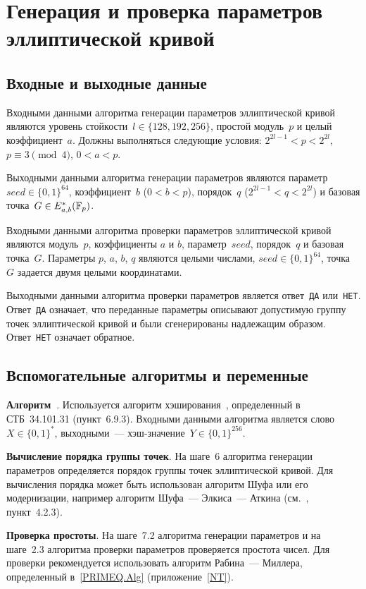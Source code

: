 \section{Генерация и проверка параметров эллиптической кривой}\label{PARAMS}

\subsection{Входные и выходные данные}

Входными данными алгоритма генерации параметров эллиптической кривой 
являются уровень стойкости~$l\in\{128,192,256\}$, 
простой модуль~$p$ и целый коэффициент~$a$.
%
Должны выполняться следующие условия: $2^{2l-1}<p<2^{2l}$,
$p\equiv 3\pmod{4}$, $0<a<p$.

Выходными данными алгоритма генерации параметров 
являются параметр~$seed\in\{0,1\}^{64}$, 
коэффициент~$b$ ($0<b<p$), 
порядок~$q$ ($2^{2l-1}<q<2^{2l}$) 
и базовая точка~$G\in E_{a,b}^*(\mathbb{F}_p)$.

Входными данными алгоритма проверки параметров эллиптической кривой
являются модуль~$p$, коэффициенты $a$ и $b$, 
параметр~$seed$, порядок~$q$ и базовая точка~$G$.
%
Параметры $p$, $a$, $b$, $q$ являются целыми числами,
$seed\in\{0,1\}^{64}$, точка~$G$ задается двумя целыми координатами.

Выходными данными алгоритма проверки параметров 
является ответ~\texttt{ДА} или~\texttt{НЕТ}. 
Ответ~\texttt{ДА} означает, что переданные параметры 
описывают допустимую группу точек эллиптической кривой
и были сгенерированы надлежащим образом.
Ответ~\texttt{НЕТ} означает обратное.

\subsection{Вспомогательные алгоритмы и переменные}
\label{PARAMS.Aux}

{\bf Алгоритм~}.
Используется алгоритм хэширования~,
определенный в СТБ~34.101.31 (пункт~6.9.3).
Входными данными алгоритма является слово~$X\in\{0,1\}^*$,
выходными~--- хэш-значение~$Y\in\{0,1\}^{256}$.

{\bf Вычисление порядка группы точек}.
На шаге~6 алгоритма генерации параметров 
определяется порядок группы точек эллиптической кривой.
%
Для вычисления порядка может быть использован алгоритм Шуфа
или его модернизации, например алгоритм Шуфа~--- Элкиса~--- Аткина
(см.~\cite{ECC}, пункт~4.2.3).

{\bf Проверка простоты}.
На шаге~7.2 алгоритма генерации параметров и на шаге~2.3
алгоритма проверки параметров проверяется простота чисел.
%
Для проверки рекомендуется использовать алгоритм 
Рабина~--- Миллера, определенный в~\ref{PRIMEQ.Alg}
(приложение~\ref{NT}).

